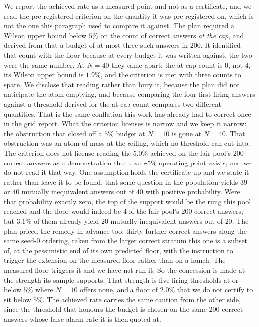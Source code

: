 We report the achieved rate as a measured point and not as a certificate, and we read the
pre-registered criterion on the quantity it was pre-registered on, which is not the one this
paragraph used to compare it against. The plan required a Wilson upper bound below $5\%$ on
the count of correct answers \emph{at the cap}, and derived from that a budget of at most
three such answers in $200$. It identified that count with the floor because at every budget
it was written against, the two were the same number. At $N{=}40$ they came apart: the
at-cap count is $0$, not $4$, its Wilson upper bound is $1.9\%$, and the criterion is met
with three counts to spare. We disclose that reading rather than bury it, because the plan
did not anticipate the atom emptying, and because comparing the four first-firing answers
against a threshold derived for the at-cap count compares two different quantities. That is
the same conflation this work has already had to correct once in the grid report. What the
criterion licenses is narrow and we keep it narrow: the obstruction that closed off a $5\%$
budget at $N{=}10$ is gone at $N{=}40$. That obstruction was an atom of mass at the ceiling,
which no threshold can cut into.
The criterion does not license reading the $5.0\%$ achieved on the fair pool's $200$
correct answers as a demonstration that a
sub-$5\%$ operating point exists, and we do not read it that way. One assumption holds the
certificate up and we state it rather than leave it to be found: that some question in the
population yields $39$ or $40$ mutually inequivalent answers out of $40$ with positive
probability. Were that probability exactly zero, the top of the support would be the rung
this pool reached and the floor would indeed be $4$ of the fair pool's $200$ correct
answers; but $3.1\%$ of them already yield $20$ mutually inequivalent answers out of $20$. The plan priced the remedy in
advance too: thirty further correct answers along
the same seed-$0$ ordering, taken from the larger correct stratum this one is a subset of,
at the pessimistic end of its own predicted floor, with the instruction to trigger the
extension on the measured floor rather than on a hunch. The measured floor triggers it and
we have not run it. So the concession is made at the strength its sample supports. That
strength is five
firing thresholds at or below $5\%$ where $N{=}10$ offers none, and a floor of $2.0\%$ that
we do not certify to sit below $5\%$.
The achieved rate carries the same caution from the other side, since the threshold that
honours the budget is chosen on the same $200$ correct answers whose false-alarm rate it is
then quoted at.

